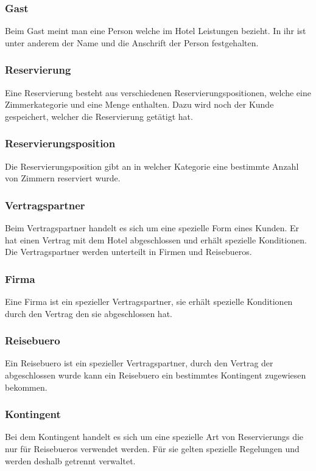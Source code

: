 \documentclass[10pt,a4paper,titlepage]{article}
\begin{document}
\subsubsection{\Gls{Gast}}
Beim \Gls{Gast} meint man eine Person welche im Hotel Leistungen bezieht. In ihr ist unter anderem der Name und die Anschrift der Person festgehalten.
\subsubsection{\Gls{Reservierung}}
Eine \Gls{Reservierung} besteht aus verschiedenen Reservierungspositionen, welche eine Zimmerkategorie und eine Menge enthalten. Dazu wird noch der \Gls{Kunde} gespeichert, welcher die \Gls{Reservierung} getätigt hat.
\subsubsection{Reservierungsposition}
Die Reservierungsposition gibt an in welcher Kategorie eine bestimmte Anzahl von
\Gls{Zimmer}n reserviert wurde.
\subsubsection{\Gls{Vertragspartner}}
Beim \Gls{Vertragspartner} handelt es sich um eine spezielle Form eines \Gls{Kunde}n.
Er hat einen Vertrag mit dem Hotel abgeschlossen und erhält spezielle Konditionen. Die \Gls{Vertragspartner} werden unterteilt in Firmen und \Glspl{Reisebuero}.
\subsubsection{Firma}
Eine Firma ist ein spezieller \Gls{Vertragspartner}, sie erhält spezielle Konditionen
durch den Vertrag den sie abgeschlossen hat.
\subsubsection{\Gls{Reisebuero}}
Ein \Gls{Reisebuero} ist ein spezieller \Gls{Vertragspartner}, durch den Vertrag der
abgeschlossen wurde kann ein \Gls{Reisebuero} ein bestimmtes \Gls{Kontingent}
zugewiesen bekommen.
\subsubsection{\Gls{Kontingent}}
Bei dem \Gls{Kontingent} handelt es sich um eine spezielle Art von \Glspl{Reservierung} die nur für \Glspl{Reisebuero} verwendet werden. Für sie gelten spezielle Regelungen und werden deshalb getrennt verwaltet.
\end{document}
